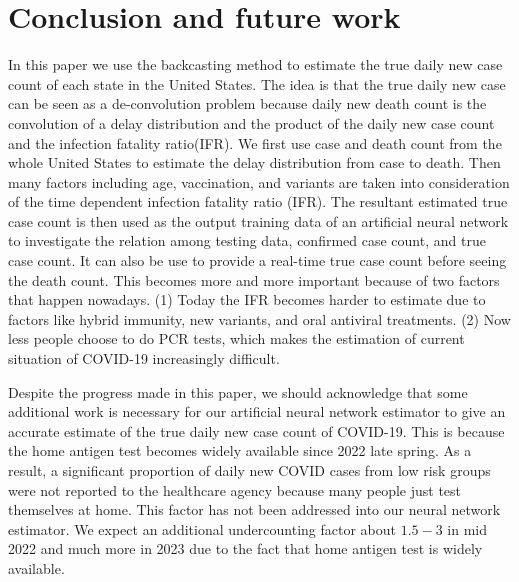 \documentclass[sn-mathphys,Numbered]{sn-jnl}
\begin{document}
\section{Conclusion and future work}

In this paper we use the backcasting method to estimate the true daily
new case count of each state in the United States. The idea is that
the true daily new case can be seen as a de-convolution problem
because daily new death count is the convolution of a delay
distribution and the product of the daily new case count and the infection fatality
ratio(IFR). We first use case and death count from the whole United
States to estimate the delay distribution from case to death. Then many factors
including age, vaccination, and variants are taken into consideration
of the time dependent infection fatality ratio (IFR). The resultant estimated true
case count is then used as the output training data of an artificial
neural network to investigate the relation among testing data,
confirmed case count, and true case count. It can also be use to
provide a real-time true case count before seeing the death count.
This becomes more and more important because of two factors that
happen nowadays. (1) Today the IFR becomes harder to estimate due
to factors like hybrid immunity, new variants, and oral antiviral
treatments. (2) Now less people choose to do PCR tests, which makes the estimation of current
situation of COVID-19 increasingly difficult. 

Despite the progress made in this paper, we should acknowledge that
some additional work is necessary for our artificial neural network
estimator to give an accurate estimate of the true daily new case count
of COVID-19. This is because the home antigen test becomes widely
available since 2022 late spring. As a result, a significant
proportion of daily new COVID cases from low risk groups were not reported to the
healthcare agency because many people just test themselves at
home. This factor has not been addressed into our neural network
estimator. We expect an additional undercounting factor about $1.5-3$
in mid 2022 and much more in 2023 due to the fact that home antigen
test is widely available.
\end{document}
